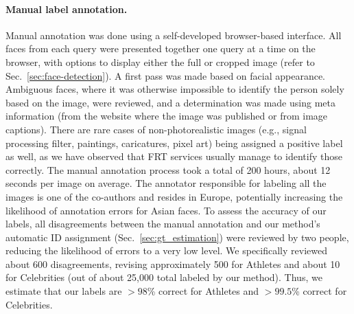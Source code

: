 \documentclass[10pt,twocolumn,letterpaper]{article}
\begin{document}
\begin{appendices}
\paragraph{Manual label annotation.}
Manual annotation was done using a self-developed browser-based interface.
All faces from each query were presented together one query at a time on the browser, with options to display either the full or cropped image (refer to Sec.~\ref{sec:face-detection}). 
A first pass was made based on facial appearance. Ambiguous faces, where it was otherwise impossible to identify the person solely based on the image, were reviewed, and a determination was made using meta information (from the website where the image was published or from image captions). There are rare cases of non-photorealistic images (e.g., signal processing filter, paintings, caricatures, pixel art) being assigned a positive label as well, as we have observed that FRT services usually manage to identify those correctly.  The manual annotation process took a total of 200 hours, about 12 seconds per image on average. The annotator responsible for labeling all the images is one of the co-authors and resides in Europe, potentially increasing the likelihood of annotation errors for Asian faces. To assess the accuracy of our labels, all disagreements between the manual annotation and our method's automatic ID assignment (Sec.~\ref{sec:gt_estimation}) were reviewed by two people, reducing the likelihood of errors to a very low level.  We specifically reviewed about 600 disagreements, revising approximately 500 for Athletes and about 10 for Celebrities (out of about 25,000 total labeled by our method). Thus, we estimate that our labels are $>98$\% correct for Athletes and $>99.5$\% correct for Celebrities.


\end{appendices}
\end{document}
